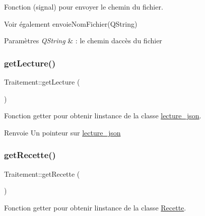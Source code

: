 Fonction (signal) pour envoyer le chemin du fichier. 

\begin{DoxySeeAlso}{Voir également}
envoie\+Nom\+Fichier(\+Q\+String) 
\end{DoxySeeAlso}

\begin{DoxyParams}{Paramètres}
{\em Q\+String} & \+: le chemin d\textquotesingle{}accès du fichier \\
\hline
\end{DoxyParams}
\mbox{\label{classTraitement_a91ecaaa93bbdc283a3eebe3c060e656d}} 
\subsubsection{\texorpdfstring{get\+Lecture()}{getLecture()}}
{\footnotesize\ttfamily Traitement\+::get\+Lecture (\begin{DoxyParamCaption}{ }\end{DoxyParamCaption})\hspace{0.3cm}{\ttfamily [inline]}}



Fonction getter pour obtenir l\textquotesingle{}instance de la classe \hyperlink{classlecture__json}{lecture\+\_\+json}. 

\begin{DoxyReturn}{Renvoie}
Un pointeur sur \hyperlink{classlecture__json}{lecture\+\_\+json} 
\end{DoxyReturn}
\mbox{\label{classTraitement_a587f76ba51e61307815c9e279821a744}} 
\subsubsection{\texorpdfstring{get\+Recette()}{getRecette()}}
{\footnotesize\ttfamily Traitement\+::get\+Recette (\begin{DoxyParamCaption}{ }\end{DoxyParamCaption})\hspace{0.3cm}{\ttfamily [inline]}}



Fonction getter pour obtenir l\textquotesingle{}instance de la classe \hyperlink{classRecette}{Recette}. 

